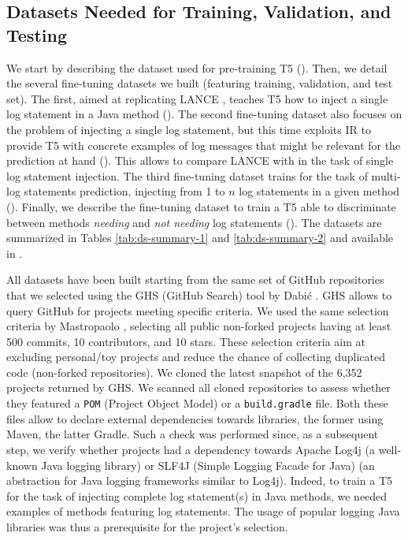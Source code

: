 \subsection{Datasets Needed for Training, Validation, and Testing}
\label{sub:datasets}

We start by describing the dataset used for pre-training T5 (). Then, we detail the several fine-tuning datasets we built (featuring training, validation, and test set). The first, aimed at replicating LANCE \cite{mastropaolo2022using}, teaches T5 how to inject a single log statement in a Java method  (). The second fine-tuning dataset also focuses on the problem of injecting a single log statement, but this time exploits IR to provide T5 with concrete examples of log messages that might be relevant for the prediction at hand (). This allows to compare LANCE with \approach in the task of single log statement injection. The third fine-tuning dataset trains \approach for the task of multi-log statements prediction, \ie injecting from 1 to $n$ log statements in a given method (). Finally, we describe the fine-tuning dataset to train a T5 able to discriminate between methods \emph{needing} and \emph{not needing} log statements (). The datasets are summarized in Tables \ref{tab:ds-summary-1} and \ref{tab:ds-summary-2} and available in \cite{replication}.


All datasets have been built starting from the same set of GitHub repositories that we selected using the GHS (GitHub Search) tool by Dabi\'c \etal \cite{dabic2021sampling}. GHS allows to query GitHub for projects meeting specific criteria. We used the same selection criteria by Mastropaolo \etal \cite{mastropaolo2022using}, selecting all public non-forked \java projects having at least 500 commits, 10 contributors, and 10 stars. These selection criteria aim at excluding personal/toy projects and reduce the chance of collecting duplicated code (non-forked repositories). We cloned the latest snapshot of the 6,352 projects returned by GHS. We scanned all cloned repositories to assess whether they featured a \texttt{POM} (Project Object Model) or a \texttt{build.gradle} file. Both these files allow to declare external dependencies towards libraries, the former using Maven, the latter Gradle. Such a check was performed since, as a subsequent step, we verify whether projects had a dependency towards Apache Log4j \cite{log4j} (\ie a well-known Java logging library) or SLF4J (Simple Logging Facade for Java) \cite{slf4j} (\ie an abstraction for Java logging frameworks similar to Log4j). Indeed, to train a T5 for the task of injecting complete log statement(s) in Java methods, we needed examples of methods featuring log statements. The usage of popular logging Java libraries was thus a prerequisite for the project's selection.

